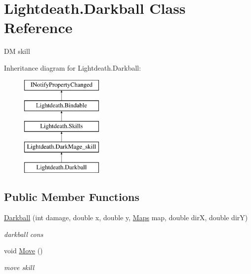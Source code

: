\hypertarget{class_lightdeath_1_1_darkball}{}\section{Lightdeath.\+Darkball Class Reference}
\label{class_lightdeath_1_1_darkball}


DM skill  


Inheritance diagram for Lightdeath.\+Darkball\+:\begin{figure}[H]
\begin{center}
\leavevmode
\includegraphics[height=5.000000cm]{class_lightdeath_1_1_darkball}
\end{center}
\end{figure}
\subsection*{Public Member Functions}
\begin{DoxyCompactItemize}
\item 
\hyperlink{class_lightdeath_1_1_darkball_a612e1a974985cdeaf323a6b4fe24bc79}{Darkball} (int damage, double x, double y, \hyperlink{class_lightdeath_1_1_maps}{Maps} map, double dirX, double dirY)
\begin{DoxyCompactList}\small\item\em darkball cons \end{DoxyCompactList}\item 
void \hyperlink{class_lightdeath_1_1_darkball_a279dc54a21460e1f45ced6bcbc99f9de}{Move} ()
\begin{DoxyCompactList}\small\item\em move skill \end{DoxyCompactList}\end{DoxyCompactItemize}
